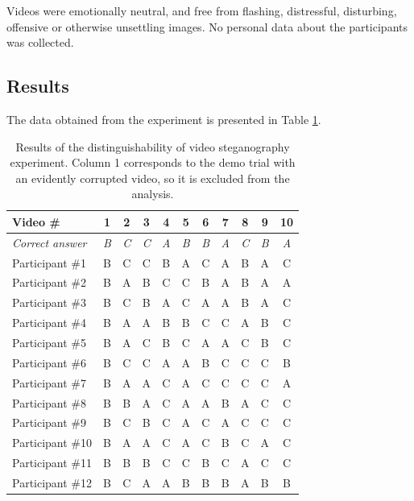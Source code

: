 \documentclass[12pt,british,twoside,notitlepage,usenames,dvipsnames,hypens,final]{report}
\numberwithin{equation}{section}
\numberwithin{figure}{section}
\begin{document}
Videos were emotionally neutral, and free from flashing, distressful, disturbing, offensive or otherwise unsettling images. No personal data about the participants was collected.

\subsection{Results}

The data obtained from the experiment is presented in Table \ref{tbl:detect-exp-res}. 

\begin{table}[tbh]
\centering
\bgroup
\def\arraystretch{1.3}
\begin{tabular}{|l|c|c|c|c|c|c|c|c|c|c|}
\hline
\textbf{Video \#} & \textbf{1} & \textbf{2} & \textbf{3} & \textbf{4} & \textbf{5} & \textbf{6} & \textbf{7} & \textbf{8} & \textbf{9} & \textbf{10}\\
\hline
\textit{Correct answer} & \textit{B} & \textit{C} & \textit{C} & \textit{A} & \textit{B} & \textit{B} & \textit{A} & \textit{C} & \textit{B} & \textit{A}\\
\hline
Participant \#1  & B & C & C & B & A & C & A & B & A & C \\
Participant \#2  & B & A & B & C & C & B & A & B & A & A \\
Participant \#3  & B & C & B & A & C & A & A & B & A & C \\
Participant \#4  & B & A & A & B & B & C & C & A & B & C \\
Participant \#5  & B & A & C & B & C & A & A & C & B & C \\
Participant \#6  & B & C & C & A & A & B & C & C & C & B \\
Participant \#7  & B & A & A & C & A & C & C & C & C & A \\
Participant \#8  & B & B & A & C & A & A & B & A & C & C \\
Participant \#9  & B & C & B & C & A & C & A & C & C & C \\
Participant \#10 & B & A & A & C & A & C & B & C & A & C \\
Participant \#11 & B & B & B & C & C & B & C & A & C & C \\
Participant \#12 & B & C & A & A & B & B & B & A & B & B \\
\hline
\end{tabular}
\egroup
\caption{Results of the distinguishability of video steganography experiment. Column 1 corresponds to the demo trial with an evidently corrupted video, so it is excluded from the analysis.}
\label{tbl:detect-exp-res}
\end{table}
\end{document}
